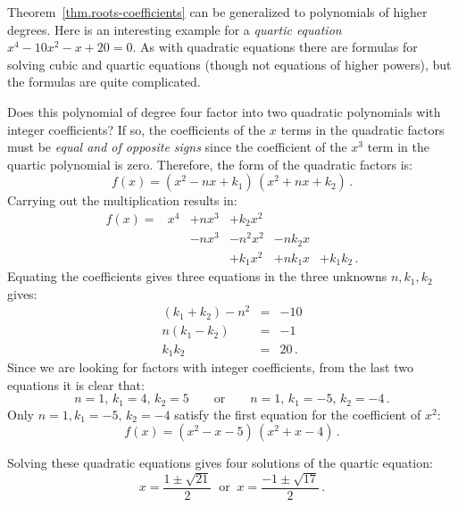 \begin{example}
Theorem~\ref{thm.roots-coefficients} can be generalized to polynomials of higher degrees. Here is an interesting example for a \emph{quartic equation} $x^4-10x^2-x+20=0$. As with quadratic equations there are formulas for solving cubic and quartic equations (though not equations of higher powers), but the formulas are quite complicated.

Does this polynomial of degree four factor into two quadratic polynomials with integer coefficients? If so, the coefficients of the $x$ terms in the quadratic factors must be \emph{equal and of opposite signs} since the coefficient of the $x^3$ term in the quartic polynomial is zero. Therefore, the form of the quadratic factors is:
\[
f(x) = (x^2 - nx + k_1)\, (x^2 + nx + k_2)\,.
\]
Carrying out the multiplication results in:
\[
\renewcommand{\arraystretch}{1.1}
\begin{array}{rrrrrr}
f(x) = &x^4 & + nx^3 & + k_2 x^2\\
&& -nx^3 &- n^2x^2 &-nk_2x\\
&&&+k_1x^2 &+ nk_1x &+ k_1k_2\,.
\end{array}
\]
Equating the coefficients gives three equations in the three unknowns $n,k_1,k_2$ gives:
\begin{eqnarray*}
(k_1+k_2)-n^2 &=& -10\\
n(k_1-k_2) &=& -1\\
k_1k_2 &=& 20\,.
\end{eqnarray*}
Since we are looking for factors with integer coefficients, from the last two equations it is clear that:
\[
n=1,\,k_1=4,\,k_2=5  \quad\quad\textrm{or} \quad\quad n=1,\,k_1=-5,\, k_2=-4\,.
\]
Only $n=1,k_1=-5,\, k_2=-4$ satisfy the first equation for the coefficient of $x^2$:
\[
f(x) = (x^2 - x - 5)\, (x^2 + x - 4)\,.
\]

\newpage

Solving these quadratic equations gives four solutions of the quartic equation:
\[
x = \frac{1\pm\sqrt{21}}{2}  \;\;\textrm{or} \;\; x= \frac{-1\pm\sqrt{17}}{2} \,.
\]
\end{example}

